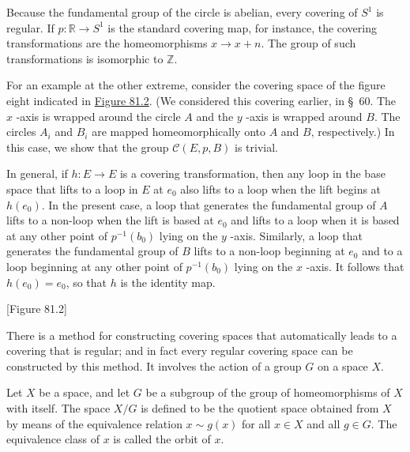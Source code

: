 \begin{centeredblock}
\begin{example}
\label{ex:\thesection.\theexample}
	Because the fundamental group of the circle is abelian, every covering of \(S^{1}\) is regular. If \(p : \mathbb{R} \rightarrow {S}^{1}\) is the standard covering map, for instance, the covering transformations are the homeomorphisms \(x \rightarrow x + n\). The group of such transformations is isomorphic to \(\mathbb{Z}\).
\end{example}
\end{centeredblock}

\begin{centeredblock}
\begin{example}
\label{ex:\thesection.\theexample}
	For an example at the other extreme, consider the covering space of the figure eight indicated in \hyperref[fig:81.2]{Figure 81.2}. (We considered this covering earlier, in \S\ 60. The \(x\) -axis is wrapped around the circle \(A\) and the \(y\) -axis is wrapped around \(B\). The circles \(A_{i}\) and \(B_{i}\) are mapped homeomorphically onto \(A\) and \(B\), respectively.) In this case, we show that the group \(\mathcal{C}( {E,p,B})\) is trivial.

In general, if \(h : E \rightarrow E\) is a covering transformation, then any loop in the base space that lifts to a loop in \(E\) at \(e_{0}\) also lifts to a loop when the lift begins at \(h( e_{0})\). In the present case, a loop that generates the fundamental group of \(A\) lifts to a non-loop when the lift is based at \(e_{0}\) and lifts to a loop when it is based at any other point of \(p^{-1}( b_{0})\) lying on the \(y\) -axis. Similarly, a loop that generates the fundamental group of \(B\) lifts to a non-loop beginning at \(e_{0}\) and to a loop beginning at any other point of \(p^{-1}( b_{0})\) lying on the \(x\) -axis. It follows that \(h( e_{0}) = e_{0}\), so that \(h\) is the identity map.

[Figure 81.2]
\end{example}
\end{centeredblock}

There is a method for constructing covering spaces that automatically leads to a covering that is regular; and in fact every regular covering space can be constructed by this method. It involves the action of a group \(G\) on a space \(X\).

\begin{definition}
	Let \(X\) be a space, and let \(G\) be a subgroup of the group of homeomorphisms of \(X\) with itself. The space \(X/G\) is defined to be the quotient space obtained from \(X\) by means of the equivalence relation \(x \sim g(x)\) for all \(x \in X\) and all \(g \in G\). The equivalence class of \(x\) is called the orbit of \(x\).
\end{definition}

